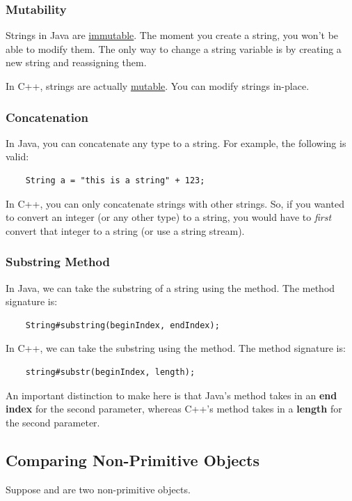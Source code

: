 \documentclass[letterpaper]{article}
\begin{document}
\subsubsection{Mutability}
Strings in Java are \underline{immutable}. The moment you create a string, you won't be able to modify them. The only way to change a string variable is by creating a new string and reassigning them. 

\bigskip 

In C++, strings are actually \underline{mutable}. You can modify strings in-place. 

\subsubsection{Concatenation}
In Java, you can concatenate any type to a string. For example, the following is valid:
\begin{verbatim}
    String a = "this is a string" + 123;\end{verbatim}

In C++, you can only concatenate strings with other strings. So, if you wanted to convert an integer (or any other type) to a string, you would have to \emph{first} convert that integer to a string (or use a string stream).

\subsubsection{Substring Method}
In Java, we can take the substring of a string using the  method. The method signature is:
\begin{verbatim}
    String#substring(beginIndex, endIndex);\end{verbatim}

In C++, we can take the substring using the  method. The method signature is:
\begin{verbatim}
    string#substr(beginIndex, length);\end{verbatim}

An important distinction to make here is that Java's  method takes in an \textbf{end index} for the second parameter, whereas C++'s  method takes in a \textbf{length} for the second parameter.



\subsection{Comparing Non-Primitive Objects}
Suppose  and  are two non-primitive objects.
\end{document}

